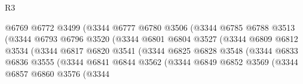 \begin{lexlean}{R3}
\begin{coremodule}
                                      @6769
                                      @6772
                                      @3499
                                      (@3344
                                        @6777
                                        @6780
                                        @3506
                                        (@3344
                                          @6785
                                          @6788
                                          @3513
                                          (@3344
                                            @6793
                                            @6796
                                            @3520
                                            (@3344
                                              @6801
                                              @6804
                                              @3527
                                              (@3344
                                                @6809
                                                @6812
                                                @3534
                                                (@3344
                                                  @6817
                                                  @6820
                                                  @3541
                                                  (@3344
                                                    @6825
                                                    @6828
                                                    @3548
                                                    (@3344
                                                      @6833
                                                      @6836
                                                      @3555
                                                      (@3344
                                                        @6841
                                                        @6844
                                                        @3562
                                                        (@3344
                                                          @6849
                                                          @6852
                                                          @3569
                                                          (@3344
                                                            @6857
                                                            @6860
                                                            @3576
                                                            (@3344

\end{coremodule}
\end{lexlean}
